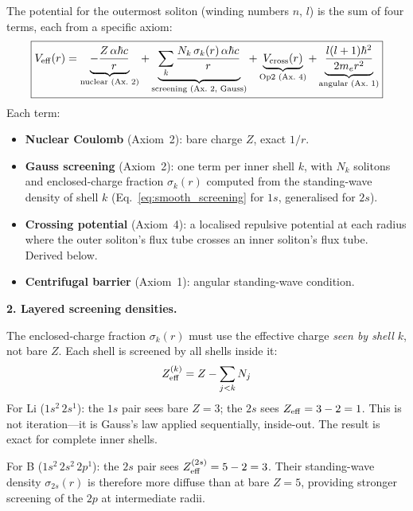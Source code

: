 The potential for the outermost soliton
(winding numbers $n$, $l$) is the sum of
four terms, each from a specific axiom:
\begin{equation}
\boxed{
    V_{\rm eff}(r) =
    \underbrace{-\frac{Z\,\alpha\hbar c}{r}}_{\text{nuclear (Ax.~2)}}
    + \underbrace{\sum_k \frac{N_k\,\sigma_k(r)\,
      \alpha\hbar c}{r}}_{\text{screening (Ax.~2, Gauss)}}
    + \underbrace{V_{\rm cross}(r)}_{\text{Op2 (Ax.~4)}}
    + \underbrace{\frac{l(l+1)\hbar^2}{2 m_e r^2}}_{\text{angular (Ax.~1)}}
}
    \label{eq:V_complete}
\end{equation}
\noindent Each term:
\begin{itemize}
    \item \textbf{Nuclear Coulomb} (Axiom~2):
          bare charge $Z$, exact $1/r$.
    \item \textbf{Gauss screening} (Axiom~2):
          one term per inner shell $k$, with
          $N_k$ solitons and enclosed-charge
          fraction $\sigma_k(r)$ computed from
          the standing-wave density of shell
          $k$ (Eq.~\ref{eq:smooth_screening}
          for $1s$, generalised for $2s$).
    \item \textbf{Crossing potential} (Axiom~4):
          a localised repulsive potential at
          each radius where the outer soliton's
          flux tube crosses an inner soliton's
          flux tube.  Derived below.
    \item \textbf{Centrifugal barrier} (Axiom~1):
          angular standing-wave condition.
\end{itemize}

\noindent\textbf{2. Layered screening densities.}

The enclosed-charge fraction $\sigma_k(r)$
must use the effective charge \emph{seen by
shell $k$}, not bare $Z$.  Each shell is
screened by all shells inside it:
\begin{equation}
    Z_{\rm eff}^{(k)} = Z - \sum_{j < k} N_j
    \label{eq:z_layered}
\end{equation}
For Li ($1s^2\,2s^1$): the $1s$ pair sees
bare $Z = 3$; the $2s$ sees
$Z_{\rm eff} = 3 - 2 = 1$.  This is not
iteration---it is Gauss's law applied
sequentially, inside-out.  The result is
exact for complete inner shells.

For B ($1s^2\,2s^2\,2p^1$): the $2s$ pair sees
$Z_{\rm eff}^{(2s)} = 5 - 2 = 3$.  Their
standing-wave density $\sigma_{2s}(r)$ is
therefore more diffuse than at bare $Z = 5$,
providing stronger screening of the $2p$ at
intermediate radii.


